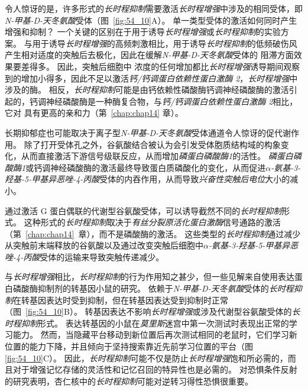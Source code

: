 令人惊讶的是，许多形式的\textit{长时程抑制}需要激活\textit{长时程增强}中涉及的相同受体，即\textit{N-甲基-D-天冬氨酸}受体（图~\ref{fig:54_10}A）。
单一类型受体的激活如何同时产生增强和抑制？
一个关键的区别在于用于诱导\textit{长时程增强}或\textit{长时程抑制}的实验方案。
与用于诱导\textit{长时程增强}的高频刺激相比，用于诱导\textit{长时程抑制}的低频破伤风产生相对适度的突触后去极化，因此在缓解\textit{N-甲基-D-天冬氨酸}受体的  阻滞方面效果要差得多。
因此，突触后细胞中  浓度的任何增加都比\textit{长时程增强}诱导期间观察到的增加小得多，因此不足以激活\textit{钙/钙调蛋白依赖性蛋白激酶 2}，\textit{长时程增强}中涉及的酶。
相反，\textit{长时程抑制}可能是由钙依赖性磷酸酶钙调神经磷酸酶的激活引起的，钙调神经磷酸酶是一种酶复合物，与\textit{钙/钙调蛋白依赖性蛋白激酶 2}相比，它对  具有更高的亲和力（第~\ref{chap:chap14} 章）。


长期抑郁症也可能取决于离子型\textit{N-甲基-D-天冬氨酸}受体通道令人惊讶的促代谢作用。
除了打开受体孔之外，谷氨酸结合被认为会引发受体胞质结构域的构象变化，从而直接激活下游信号级联反应，从而增加\textit{磷蛋白磷酸酶1}的活性。
\textit{磷蛋白磷酸酶1}或钙调神经磷酸酶的激活最终导致蛋白质磷酸化的变化，从而促进\textit{$\alpha$-氨基-3-羟基-5-甲基异恶唑-4-丙酸}受体的内吞作用，从而导致\textit{兴奋性突触后电位}大小的减小。


通过激活 G 蛋白偶联的代谢型谷氨酸受体，可以诱导截然不同的\textit{长时程抑制}形式。
这种形式的\textit{长时程抑制}取决于\textit{\textit{有丝分裂原活化蛋白激酶}}信号通路的激活（第~\ref{chap:chap14}~章），而不是磷酸酶的激活。
这些类型的\textit{长时程抑制}通过减少从突触前末端释放的谷氨酸以及通过改变突触后细胞中\textit{$\alpha$-氨基-3-羟基-5-甲基异恶唑-4-丙酸}受体的运输来导致突触传递减少。


与\textit{长时程增强}相比，\textit{长时程抑制}的行为作用知之甚少，但一些见解来自使用表达蛋白磷酸酶抑制剂的转基因小鼠的研究。
依赖于\textit{N-甲基-D-天冬氨酸}受体的\textit{长时程抑制}在转基因表达时受到抑制，但在转基因表达受到抑制时正常（图~\ref{fig:54_10}B）。
转基因表达不影响\textit{长时程增强}或涉及代谢型谷氨酸受体的\textit{长时程抑制}形式。
表达转基因的小鼠在\textit{莫里斯}迷宫中第一次测试时表现出正常的学习能力。
然而，当隐藏平台移动到新位置后再次测试相同的老鼠时，它们学习新位置的能力下降，并且倾向于坚持搜索靠近先前学习位置的平台（图 \ref{fig:54_10}C）。
因此，\textit{长时程抑制}可能不仅是防止\textit{长时程增强}饱和所必需的，而且对于增强记忆存储的灵活性和记忆召回的特异性也是必需的。
对恐惧条件反射的研究表明，杏仁核中的\textit{长时程抑制}可能对逆转习得性恐惧很重要。



